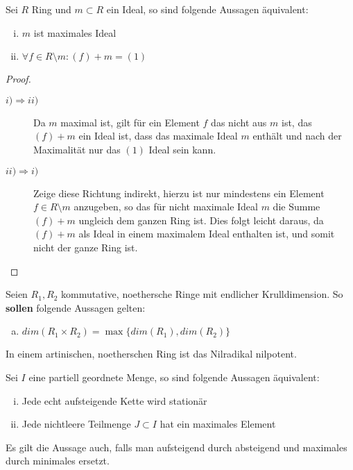 \documentclass[ngerman, parskip=half, titlepage=false]{scrartcl}
\begin{document}
\begin{Beh}
  Sei $R$ Ring und $m \subset R$ ein Ideal, so sind folgende Aussagen äquivalent:\\
  \begin{enumerate}[i)]
    \item $m$ ist maximales Ideal
    \item $\forall f \in R  \setminus m : (f) + m = (1) $ 
  \end{enumerate}
  \begin{proof}
    \begin{description}
      \item[$i) \Rightarrow ii)$] Da $m$ maximal ist, gilt für ein Element $f$ das 
        nicht aus $m$ ist, das $(f) + m$ ein Ideal ist, dass das maximale Ideal
        $m$ enthält und nach der Maximalität nur das $(1)$ Ideal sein kann.
      \item[$ii) \Rightarrow i)$] Zeige diese Richtung indirekt, hierzu ist
        nur mindestens ein Element $f \in R \setminus m$ anzugeben, so das für
        nicht maximale Ideal $m$ die Summe $(f) + m $ ungleich dem ganzen Ring
        ist. Dies folgt leicht daraus, da $(f) + m$ als Ideal in einem maximalem
        Ideal enthalten ist, und somit nicht der ganze Ring ist.
    \end{description}
  \end{proof}
\end{Beh}

\begin{Beh}
  Seien $R_1,R_2$ kommutative, noethersche Ringe mit endlicher
  Krulldimension. So \textbf{sollen} folgende Aussagen
  gelten:\\
  \begin{enumerate}[a)]
    \item $dim(R_1 \times R_2) =  \max \{ dim(R_1), dim(R_2) \} $
  \end{enumerate}
\end{Beh}

\begin{Lem}
  In einem artinischen, noetherschen  Ring ist das Nilradikal nilpotent.
\end{Lem}

\begin{Lem}
  Sei $I$ eine partiell geordnete Menge, so sind folgende Aussagen äquivalent:\\
  \begin{enumerate}[i)]
    \item Jede echt aufsteigende Kette wird stationär
    \item Jede nichtleere Teilmenge $J \subset I$ hat ein maximales Element
  \end{enumerate}
  Es gilt die Aussage auch, falls man aufsteigend durch absteigend und maximales
  durch minimales ersetzt.
\end{Lem}
\end{document}
